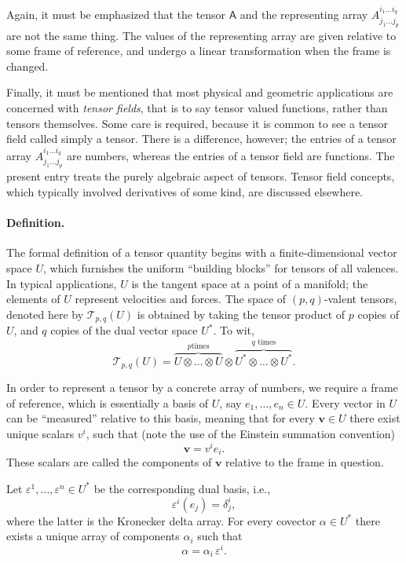 \documentclass[12pt]{article}
\newcommand{\Uspace}{U}
\newcommand{\veps}{\varepsilon}
\newcommand{\cT}{\mathcal{T}}
\newcommand{\bA}{\mathsf{A}}
\newcommand{\ve}{e}
\newcommand{\bv}{\mathbf{v}}
\newcommand{\bal}{\alpha}
\begin{document}
Again, it must be emphasized that the tensor $\bA$ and the
representing array $A^{i_1\ldots i_q}_{j_1\ldots j_p}$ are not the
same thing.  The values of the representing array are given relative
to some frame of reference, and undergo a linear transformation when
the frame is changed.  


Finally, it must be mentioned that most physical and geometric
applications are concerned with \emph{tensor fields}, that is to say
tensor valued functions, rather than tensors themselves.  Some care is
required, because it is common to see a tensor field called simply a
tensor.  There is a difference, however; the entries of a tensor array
$A^{i_1\ldots i_q}_{j_1\ldots j_p}$ are numbers, whereas the entries
of a tensor field are functions.  The present entry treats the purely
algebraic aspect of tensors.  Tensor field concepts, which typically
involved derivatives of some kind, are discussed elsewhere.

\paragraph{Definition.}
The formal definition of a tensor quantity begins with a
finite-dimensional vector space $\Uspace$, which furnishes the uniform
``building blocks'' for tensors of all valences. In typical
applications, $\Uspace$ is the tangent space at a point of a manifold; the
elements of $\Uspace$ represent velocities and forces.  The space of
$(p,q)$-valent tensors, denoted here by $\cT_{p,q}(\Uspace)$ is obtained by
taking the tensor product of $p$ copies of $\Uspace$, and $q$ copies of
the dual vector space $\Uspace^*$.  To wit,
$$\cT_{p,q}(\Uspace) = \overbrace{\Uspace\otimes\ldots\otimes\Uspace}^{p\text{
    times}}
\otimes
\overbrace{\Uspace^*\otimes\ldots\otimes\Uspace^*}^{q\text{ times}}.$$

In order to represent a tensor by a concrete array of numbers, we
require a frame of reference, which is essentially a basis of $\Uspace$,
say
$\ve_1,\ldots,\ve_n \in \Uspace.$
Every vector in $\Uspace$ can be
``measured'' relative to this basis, meaning that for every
$\bv\in\Uspace$ there exist unique scalars $v^i$, such
that (note the use of the Einstein summation convention)
$$\bv = v^i\ve_i.$$
These scalars are called the components of $\bv$ relative to the frame
in question.

Let $\veps^1,\ldots,\veps^n\in\Uspace^*$ be the corresponding dual
basis, i.e.,  
$$\veps^i(\ve_j) = \delta^i_j,$$
where the latter is the Kronecker delta array.  For every covector
$\bal\in\Uspace^*$ there exists a unique array of components $\alpha_i$ such
that 
$$\bal = \alpha_i\, \veps^i.$$
\end{document}
